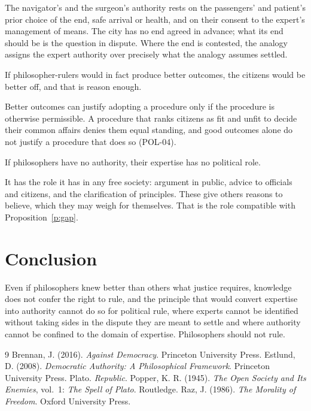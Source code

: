 \documentclass{situationist-preprint}
\begin{document}
\begin{reply}
The navigator's and the surgeon's authority rests on the passengers' and patient's prior choice of the end, safe arrival or health, and on their consent to the expert's management of means. The city has no end agreed in advance; what its end should be is the question in dispute. Where the end is contested, the analogy assigns the expert authority over precisely what the analogy assumes settled.
\end{reply}

\begin{objection}
If philosopher-rulers would in fact produce better outcomes, the citizens would be better off, and that is reason enough.
\end{objection}

\begin{reply}
Better outcomes can justify adopting a procedure only if the procedure is otherwise permissible. A procedure that ranks citizens as fit and unfit to decide their common affairs denies them equal standing, and good outcomes alone do not justify a procedure that does so (POL-04).
\end{reply}

\begin{objection}
If philosophers have no authority, their expertise has no political role.
\end{objection}

\begin{reply}
It has the role it has in any free society: argument in public, advice to officials and citizens, and the clarification of principles. These give others reasons to believe, which they may weigh for themselves. That is the role compatible with Proposition~\ref{p:gap}.
\end{reply}

\section{Conclusion}

Even if philosophers knew better than others what justice requires, knowledge does not confer the right to rule, and the principle that would convert expertise into authority cannot do so for political rule, where experts cannot be identified without taking sides in the dispute they are meant to settle and where authority cannot be confined to the domain of expertise. Philosophers should not rule.

\begin{thebibliography}{9}\small
{} Brennan, J. (2016). \emph{Against Democracy}. Princeton University Press.
 Estlund, D. (2008). \emph{Democratic Authority: A Philosophical Framework}. Princeton University Press.
 Plato. \emph{Republic}.
 Popper, K. R. (1945). \emph{The Open Society and Its Enemies}, vol.~1: \emph{The Spell of Plato}. Routledge.
 Raz, J. (1986). \emph{The Morality of Freedom}. Oxford University Press.
\end{thebibliography}
\end{document}
